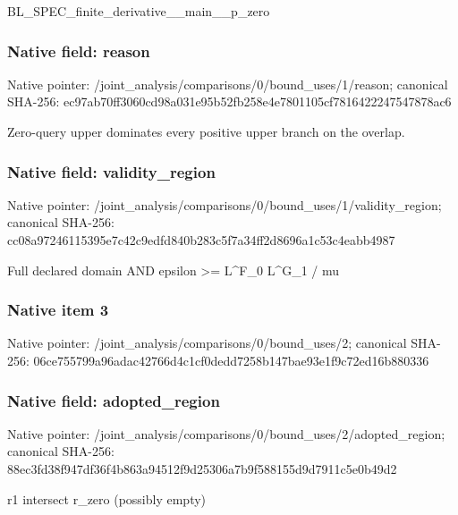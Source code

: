\documentclass[10pt,a4paper]{article}
\begin{document}
\begingroup\raggedright\sloppy BL\_\allowbreak{}SPEC\_\allowbreak{}finite\_\allowbreak{}derivative\_\allowbreak{}\_\allowbreak{}main\_\allowbreak{}\_\allowbreak{}p\_\allowbreak{}zero\par\endgroup

\subsubsection{Native field: reason}
Native pointer: /joint\_\allowbreak{}analysis/comparisons/0/bound\_\allowbreak{}uses/1/reason; canonical SHA-256: ec97ab70ff3060cd98a031e95b52fb258e4e7801105cf7816422247547878ac6

\begingroup\raggedright\sloppy Zero-query upper dominates every positive upper branch on the overlap.\par\endgroup

\subsubsection{Native field: validity\_\allowbreak{}region}
Native pointer: /joint\_\allowbreak{}analysis/comparisons/0/bound\_\allowbreak{}uses/1/validity\_\allowbreak{}region; canonical SHA-256: cc08a97246115395e7c42c9edfd840b283c5f7a34ff2d8696a1c53c4eabb4987

\begingroup\raggedright\sloppy Full declared domain AND epsilon >=\allowbreak{} L\textasciicircum{}F\_\allowbreak{}0 L\textasciicircum{}G\_\allowbreak{}1 /\allowbreak{} mu\par\endgroup

\subsubsection{Native item 3}
Native pointer: /joint\_\allowbreak{}analysis/comparisons/0/bound\_\allowbreak{}uses/2; canonical SHA-256: 06ce755799a96adac42766d4c1cf0dedd7258b147bae93e1f9c72ed16b880336

\subsubsection{Native field: adopted\_\allowbreak{}region}
Native pointer: /joint\_\allowbreak{}analysis/comparisons/0/bound\_\allowbreak{}uses/2/adopted\_\allowbreak{}region; canonical SHA-256: 88ec3fd38f947df36f4b863a94512f9d25306a7b9f588155d9d7911c5e0b49d2

\begingroup\raggedright\sloppy r1 intersect r\_\allowbreak{}zero (possibly empty)\par\endgroup
\end{document}
